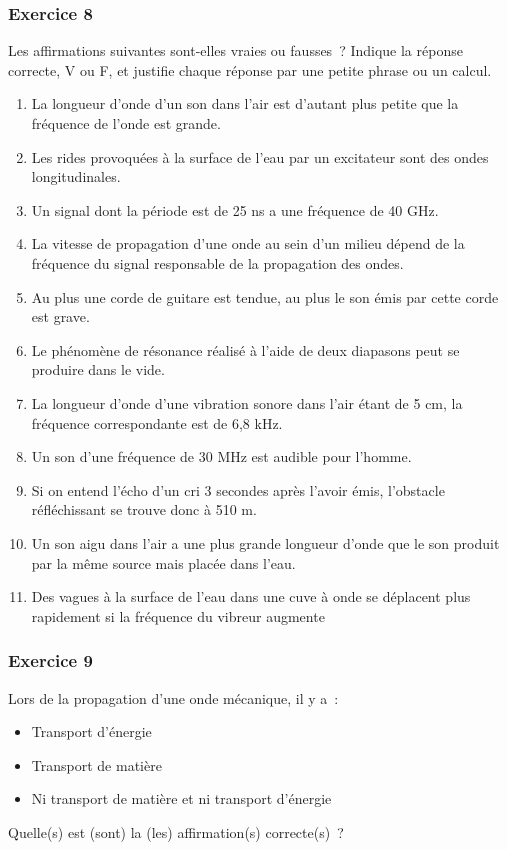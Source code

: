 \subsubsection*{Exercice 8}\label{exercice-son-8}

Les affirmations suivantes sont-elles vraies ou fausses~? Indique la
réponse correcte, V ou F, et justifie chaque réponse par une petite phrase ou 
un calcul.
\begin{enumerate}
\item
  La longueur d'onde d'un son dans l'air est d'autant plus petite que la
  fréquence de l'onde est grande.
\item
  Les rides provoquées à la surface de l'eau par un excitateur sont des
  ondes longitudinales.
\item
  Un signal dont la période est de 25 ns a une fréquence de 40 GHz.
\item
  La vitesse de propagation d'une onde au sein d'un milieu dépend de la
  fréquence du signal responsable de la propagation des ondes.
\item
  Au plus une corde de guitare est tendue, au plus le son émis par cette
  corde est grave.
\item
  Le phénomène de résonance réalisé à l'aide de deux diapasons peut se
  produire dans le vide.
\item
  La longueur d'onde d'une vibration sonore dans l'air étant de 5 cm, la
  fréquence correspondante est de 6,8 kHz.
\item
  Un son d'une fréquence de 30 MHz est audible pour l'homme.
\item
  Si on entend l'écho d'un cri 3 secondes après l'avoir émis, l'obstacle
  réfléchissant se trouve donc à 510 m.
\item
  Un son aigu dans l'air a une plus grande longueur d'onde que le son
  produit par la même source mais placée dans l'eau.
\item
  Des vagues à la surface de l'eau dans une cuve à onde se déplacent
  plus rapidement si la fréquence du vibreur augmente
\end{enumerate}

\subsubsection*{Exercice 9 }
\label{exercice-9-son}
Lors de la propagation d'une onde mécanique, il y a~: 
  \begin{itemize} 
       \item   Transport d'énergie
       \item   Transport de matière
       \item  Ni transport de matière et ni transport d'énergie
   \end{itemize}
Quelle(s) est (sont) la (les) affirmation(s) correcte(s)~?

